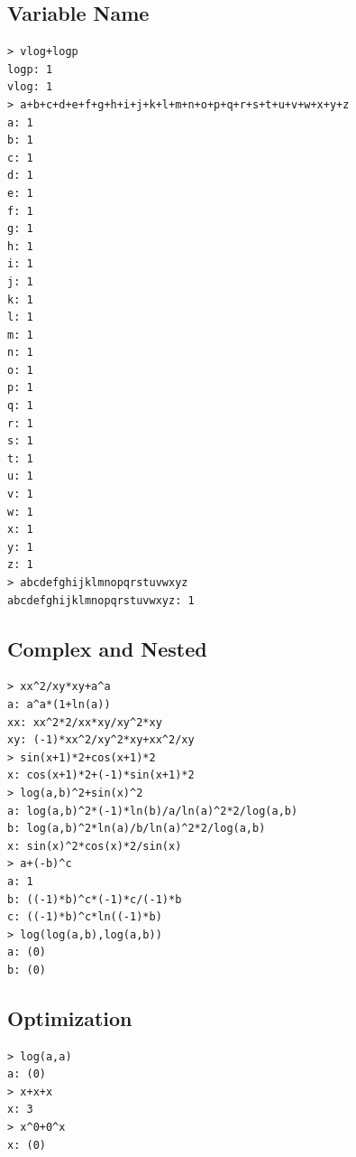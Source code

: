 \documentclass[a4paper,oneside]{book}
\begin{document}
\subsection{Variable Name}

\begin{verbatim}
> vlog+logp
logp: 1
vlog: 1
> a+b+c+d+e+f+g+h+i+j+k+l+m+n+o+p+q+r+s+t+u+v+w+x+y+z
a: 1
b: 1
c: 1
d: 1
e: 1
f: 1
g: 1
h: 1
i: 1
j: 1
k: 1
l: 1
m: 1
n: 1
o: 1
p: 1
q: 1
r: 1
s: 1
t: 1
u: 1
v: 1
w: 1
x: 1
y: 1
z: 1
> abcdefghijklmnopqrstuvwxyz
abcdefghijklmnopqrstuvwxyz: 1
\end{verbatim}

\subsection{Complex and Nested}

\begin{verbatim}
> xx^2/xy*xy+a^a
a: a^a*(1+ln(a))
xx: xx^2*2/xx*xy/xy^2*xy
xy: (-1)*xx^2/xy^2*xy+xx^2/xy
> sin(x+1)*2+cos(x+1)*2
x: cos(x+1)*2+(-1)*sin(x+1)*2
> log(a,b)^2+sin(x)^2
a: log(a,b)^2*(-1)*ln(b)/a/ln(a)^2*2/log(a,b)
b: log(a,b)^2*ln(a)/b/ln(a)^2*2/log(a,b)
x: sin(x)^2*cos(x)*2/sin(x)
> a+(-b)^c
a: 1
b: ((-1)*b)^c*(-1)*c/(-1)*b
c: ((-1)*b)^c*ln((-1)*b)
> log(log(a,b),log(a,b))
a: (0)
b: (0)
\end{verbatim}

\subsection{Optimization}

\begin{verbatim}
> log(a,a)
a: (0)
> x+x+x
x: 3
> x^0+0^x
x: (0)
\end{verbatim}


\end{document}
